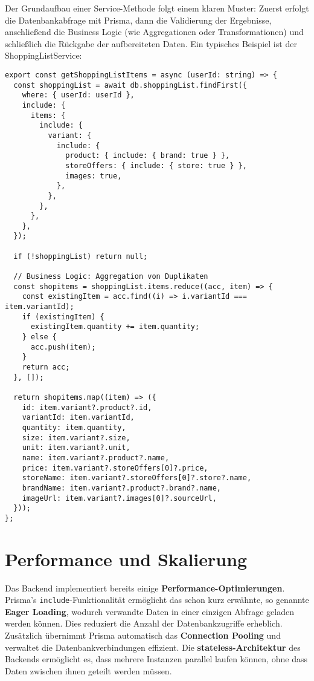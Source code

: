 Der Grundaufbau einer Service-Methode folgt einem klaren Muster: Zuerst erfolgt die Datenbankabfrage mit Prisma, dann die Validierung der Ergebnisse, anschließend die Business Logic (wie Aggregationen oder Transformationen) und schließlich die Rückgabe der aufbereiteten Daten. Ein typisches Beispiel ist der ShoppingListService:

\begin{lstlisting}[style=typescriptstyle,caption={Service-Layer Beispiel}]
export const getShoppingListItems = async (userId: string) => {
  const shoppingList = await db.shoppingList.findFirst({
    where: { userId: userId },
    include: {
      items: {
        include: {
          variant: {
            include: {
              product: { include: { brand: true } },
              storeOffers: { include: { store: true } },
              images: true,
            },
          },
        },
      },
    },
  });

  if (!shoppingList) return null;

  // Business Logic: Aggregation von Duplikaten
  const shopitems = shoppingList.items.reduce((acc, item) => {
    const existingItem = acc.find((i) => i.variantId === item.variantId);
    if (existingItem) {
      existingItem.quantity += item.quantity;
    } else {
      acc.push(item);
    }
    return acc;
  }, []);

  return shopitems.map((item) => ({
    id: item.variant?.product?.id,
    variantId: item.variantId,
    quantity: item.quantity,
    size: item.variant?.size,
    unit: item.variant?.unit,
    name: item.variant?.product?.name,
    price: item.variant?.storeOffers[0]?.price,
    storeName: item.variant?.storeOffers[0]?.store?.name,
    brandName: item.variant?.product?.brand?.name,
    imageUrl: item.variant?.images[0]?.sourceUrl,
  }));
};
\end{lstlisting}

\section{Performance und Skalierung}

Das Backend implementiert bereits einige \textbf{Performance-Optimierungen}. Prisma's \texttt{include}-Funktionalität ermöglicht das schon kurz erwähnte, so genannte \textbf{Eager Loading}, wodurch verwandte Daten in einer einzigen Abfrage geladen werden können. Dies reduziert die Anzahl der Datenbankzugriffe erheblich. Zusätzlich übernimmt Prisma automatisch das \textbf{Connection Pooling} und verwaltet die Datenbankverbindungen effizient. Die \textbf{stateless-Architektur} des Backends ermöglicht es, dass mehrere Instanzen parallel laufen können, ohne dass Daten zwischen ihnen geteilt werden müssen.

